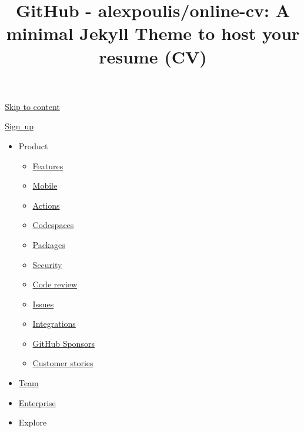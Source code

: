 \documentclass[english,]{article}
\title{GitHub - alexpoulis/online-cv: A minimal Jekyll Theme to host your
resume (CV)}
\date{}
\providecommand{\tightlist}{%
  \setlength{\itemsep}{0pt}\setlength{\parskip}{0pt}}
\begin{document}
\maketitle

\protect\hyperlink{start-of-content}{Skip to content} { {} }

\href{/signup?ref_cta=Sign+up\&ref_loc=header+logged+out\&ref_page=\%2F\%3Cuser-name\%3E\%2F\%3Crepo-name\%3E\&source=header-repo}{Sign~up}

\begin{itemize}
\tightlist
\item
  Product

  \begin{itemize}
  \tightlist
  \item
    \href{/features}{Features}
  \item
    \href{/mobile}{Mobile}
  \item
    \href{/features/actions}{Actions}
  \item
    \href{/features/codespaces}{Codespaces}
  \item
    \href{/features/packages}{Packages}
  \item
    \href{/features/security}{Security}
  \item
    \href{/features/code-review}{Code review}
  \item
    \href{/features/issues}{Issues}
  \item
    \href{/features/integrations}{Integrations}
  \item
    \href{/sponsors}{GitHub Sponsors}
  \item
    \href{/customer-stories}{Customer stories}
  \end{itemize}
\item
  \href{/team}{Team}
\item
  \href{/enterprise}{Enterprise}
\item
  Explore


\end{itemize}
\end{document}
